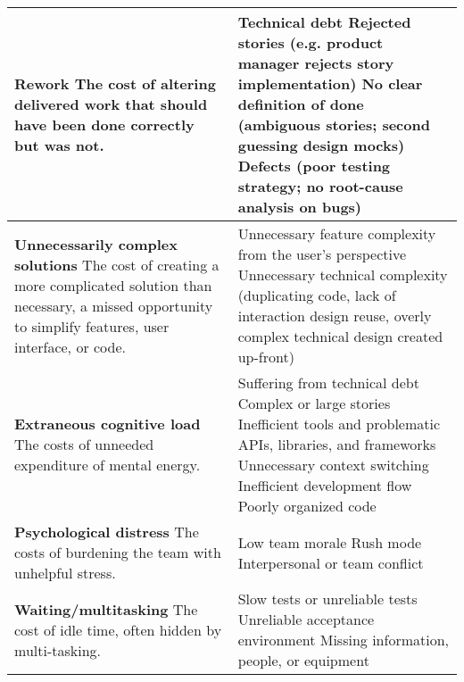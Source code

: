 \begin{table*}[htbp]
\begin{tabular}{|p{2.5in}|p{3.6in}|}
\textbf{Rework} \newline
The cost of altering delivered work that should have been done correctly but was not. & 
Technical debt \newline
Rejected stories (e.g. product manager rejects story implementation) \newline 
No clear definition of done (ambiguous stories; second guessing design mocks) \newline Defects (poor testing strategy; no root-cause analysis on bugs)                                                                                                                                                                   \\ \hline
\textbf{Unnecessarily complex solutions} \newline
The cost of creating a more complicated solution than necessary,  a missed opportunity to simplify features, user interface, or code.      & 
Unnecessary feature complexity from the user's perspective \newline
Unnecessary technical complexity (duplicating code, lack of interaction design reuse, overly complex technical design created up-front)
\\ \hline
\textbf{Extraneous cognitive load} \newline
The costs of unneeded expenditure of mental energy.  &  
Suffering from technical debt \newline	
Complex or large stories \newline	
Inefficient tools and problematic APIs, libraries, and frameworks \newline	
Unnecessary context switching \newline	
Inefficient development flow \newline	
Poorly organized code	
\\ \hline
\textbf{Psychological distress} \newline
The costs of burdening the team with unhelpful stress. &  
Low team morale \newline
Rush mode \newline
Interpersonal or team conflict
\\ \hline
\textbf{Waiting/multitasking} \newline 
The cost of idle time, often hidden by multi-tasking. & Slow tests or unreliable tests \newline Unreliable acceptance environment \newline Missing information, people, or equipment \newline

\end{tabular}
\end{table*}
